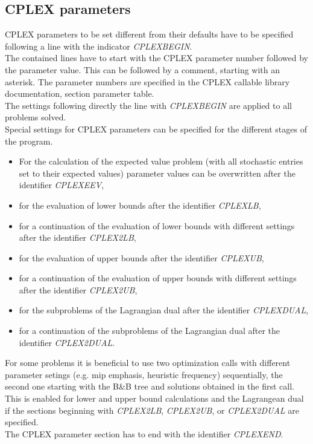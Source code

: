 \documentclass[11pt,draft]{article}
\newcommand{\+}{{\ti{+}}}
\newcommand{\1}{{\ti{1}}}
\begin{document}
\subsection{CPLEX parameters}
CPLEX parameters to be set different from their defaults have to be specified following a line with the indicator {\it CPLEXBEGIN}.\\
The contained lines have to start with the CPLEX parameter number followed by the parameter value. This can be followed by a comment, starting with an asterisk.
The parameter numbers are specified in the CPLEX callable library documentation, section parameter table.\\
The settings following directly the line with {\it CPLEXBEGIN} are applied to all problems solved.\\[0.5em]
Special settings for CPLEX parameters can be specified for the different stages of the program.
\begin{itemize}\topsep0em\itemsep0.1em
\item For the calculation of the expected value problem (with all stochastic entries set to their expected values)
parameter values can be overwritten after the identifier {\it CPLEXEEV},
\item for the evaluation of lower bounds after the identifier {\it CPLEXLB},
\item for a continuation of the evaluation of lower bounds with different settings after the identifier {\it CPLEX2LB},
\item for the evaluation of upper bounds after the identifier {\it CPLEXUB},
\item for a continuation of the evaluation of upper bounds with different settings after the identifier {\it CPLEX2UB},
\item for the subproblems of the Lagrangian dual after the identifier {\it CPLEXDUAL},
\item for a continuation of the subproblems of the Lagrangian dual after the identifier {\it CPLEX2DUAL}.
\end{itemize}
For some problems it is beneficial to use two optimization calls with different parameter setings (e.g. mip emphasis, heuristic frequency)
sequentially, the second one starting with the B\&B tree and solutions obtained in the first call. This is enabled for lower and upper bound calculations and the Lagrangean dual if the sections beginning 
with {\it CPLEX2LB}, {\it CPLEX2UB}, or  {\it CPLEX2DUAL} are specified.\\[0.5em]
The CPLEX parameter section has to end with the identifier {\it CPLEXEND}.
\end{document}
